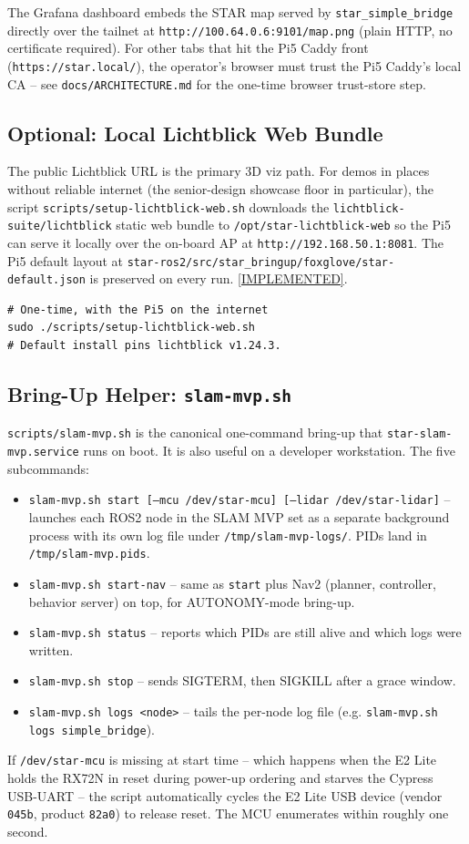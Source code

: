 \documentclass[11pt,letterpaper]{article}
\newcommand{\statuslabel}[1]{\hyperref[sec:status-legend]{[#1]}}
\begin{document}
The Grafana dashboard embeds the STAR map served by
\texttt{star\_simple\_bridge} directly over the tailnet at
\texttt{http://100.64.0.6:9101/map.png} (plain HTTP, no certificate
required). For other tabs that hit the Pi5 Caddy front
(\texttt{https://star.local/}), the operator's browser must trust
the Pi5 Caddy's local CA -- see \texttt{docs/ARCHITECTURE.md} for
the one-time browser trust-store step.

\subsection{Optional: Local Lichtblick Web Bundle}
The public Lichtblick URL is the primary 3D viz path. For
demos in places without reliable internet (the senior-design
showcase floor in particular), the script
\texttt{scripts/setup-lichtblick-web.sh} downloads the
\texttt{lichtblick-suite/lichtblick} static web bundle to
\texttt{/opt/star-lichtblick-web} so the Pi5 can serve it
locally over the on-board AP at
\texttt{http://192.168.50.1:8081}. The Pi5 default layout at
\texttt{star-ros2/src/star\_bringup/foxglove/star-default.json}
is preserved on every run. \statuslabel{IMPLEMENTED}.
\begin{lstlisting}[style=shellcmd]
# One-time, with the Pi5 on the internet
sudo ./scripts/setup-lichtblick-web.sh
# Default install pins lichtblick v1.24.3.
\end{lstlisting}

\subsection{Bring-Up Helper: \texttt{slam-mvp.sh}}
\texttt{scripts/slam-mvp.sh} is the canonical one-command bring-up
that \texttt{star-slam-mvp.service} runs on boot. It is also useful
on a developer workstation. The five subcommands:
\begin{itemize}[leftmargin=1.4em,itemsep=2pt]
\item \texttt{slam-mvp.sh start [--mcu /dev/star-mcu]
      [--lidar /dev/star-lidar]} -- launches each ROS2 node in the
      SLAM MVP set as a separate background process with its own
      log file under \texttt{/tmp/slam-mvp-logs/}. PIDs land in
      \texttt{/tmp/slam-mvp.pids}.
\item \texttt{slam-mvp.sh start-nav} -- same as \texttt{start} plus
      Nav2 (planner, controller, behavior server) on top, for
      AUTONOMY-mode bring-up.
\item \texttt{slam-mvp.sh status} -- reports which PIDs are still
      alive and which logs were written.
\item \texttt{slam-mvp.sh stop} -- sends SIGTERM, then SIGKILL after
      a grace window.
\item \texttt{slam-mvp.sh logs <node>} -- tails the per-node log
      file (e.g. \texttt{slam-mvp.sh logs simple\_bridge}).
\end{itemize}
If \texttt{/dev/star-mcu} is missing at start time -- which happens
when the E2 Lite holds the RX72N in reset during power-up ordering
and starves the Cypress USB-UART -- the script automatically cycles
the E2 Lite USB device (vendor \texttt{045b}, product
\texttt{82a0}) to release reset. The MCU enumerates within roughly
one second.
\end{document}
